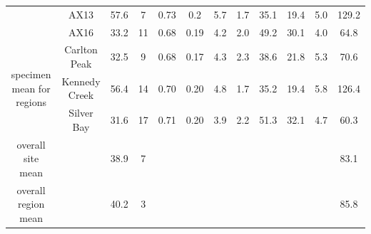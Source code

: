 \documentclass[9pt,twoside]{pnas-new}
\begin{document}
\begin{table}[]
\begin{tabular}{cccccccccccc}
                                           & AX13          & 57.6      & 7  & 0.73 & 0.2     & 5.7            & 1.7             & 35.1       & 19.4          & 5.0      & 129.2         \\
                                           & AX16          & 33.2      & 11 & 0.68 & 0.19    & 4.2            & 2.0             & 49.2       & 30.1          & 4.0      & 64.8          \\ \hline
\multirow{3}{*}{specimen mean for regions} & Carlton Peak  & 32.5      & 9  & 0.68 & 0.17    & 4.3            & 2.3             & 38.6       & 21.8          & 5.3      & 70.6          \\
                                           & Kennedy Creek & 56.4      & 14 & 0.70 & 0.20    & 4.8            & 1.7             & 35.2       & 19.4          & 5.8      & 126.4         \\
                                           & Silver Bay    & 31.6      & 17 & 0.71 & 0.20    & 3.9            & 2.2             & 51.3       & 32.1          & 4.7      & 60.3          \\ \hline
overall site mean                          &               & 38.9      & 7  &      &         &                &                 &            &               &          & 83.1          \\
overall region mean                        &               & 40.2      & 3  &      &         &                &                 &            &               &          & 85.8         
\end{tabular}
\end{table}



\clearpage


\FloatBarrier


\end{document}
